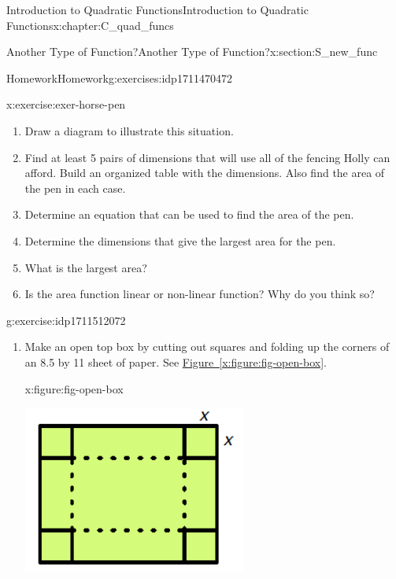 \documentclass[oneside,10pt,]{book}
\newcommand{\xreffont}{\relax}
\numberwithin{equation}{chapter}
\begin{document}
\begin{chapterptx}{Introduction to Quadratic Functions}{}{Introduction to Quadratic Functions}{}{}{x:chapter:C_quad_funcs}
\begin{sectionptx}{Another Type of Function?}{}{Another Type of Function?}{}{}{x:section:S_new_func}
\begin{exercises-subsection}{Homework}{}{Homework}{}{}{g:exercises:idp1711470472}
\begin{divisionexercise}{6}{}{}{x:exercise:exer-horse-pen}
\begin{enumerate}[font=\bfseries,label=(\alph*),ref=\alph*]
\item{}Draw a diagram to illustrate this situation.%
\item{}Find at least 5 pairs of dimensions that will use all of the fencing Holly can afford. Build an organized table with the dimensions. Also find the area of the pen in each case.%
\item{}Determine an equation that can be used to find the area of the pen.%
\item{}Determine the dimensions that give the largest area for the pen.%
\item{}What is the largest area?%
\item{}Is the area function linear or non-linear function? Why do you think so?%
\end{enumerate}
\end{divisionexercise}%
\begin{divisionexercise}{7}{}{}{g:exercise:idp1711512072}%
\begin{enumerate}[font=\bfseries,label=(\alph*),ref=\alph*]
\item{}Make an open top box by cutting out squares and folding up the corners of an 8.5 by 11 sheet of paper. See \hyperref[x:figure:fig-open-box]{Figure~{\xreffont\ref{x:figure:fig-open-box}}}.%
\begin{figureptx}{}{x:figure:fig-open-box}{}%
\begin{image}{0.3}{0.4}{0.3}%
\includegraphics[width=\linewidth]{external/open-box.pdf}
\end{image}%

\end{figureptx}
\end{enumerate}
\end{divisionexercise}
\end{exercises-subsection}
\end{sectionptx}
\end{chapterptx}
\end{document}
